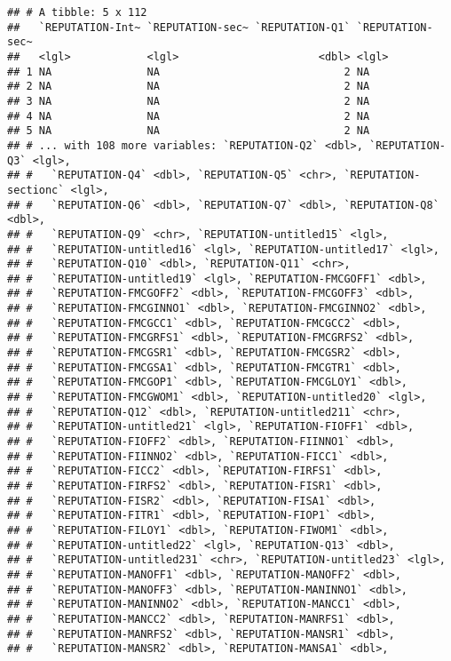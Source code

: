 \documentclass[
]{article}
\begin{document}
\begin{verbatim}
## # A tibble: 5 x 112
##   `REPUTATION-Int~ `REPUTATION-sec~ `REPUTATION-Q1` `REPUTATION-sec~
##   <lgl>            <lgl>                      <dbl> <lgl>           
## 1 NA               NA                             2 NA              
## 2 NA               NA                             2 NA              
## 3 NA               NA                             2 NA              
## 4 NA               NA                             2 NA              
## 5 NA               NA                             2 NA              
## # ... with 108 more variables: `REPUTATION-Q2` <dbl>, `REPUTATION-Q3` <lgl>,
## #   `REPUTATION-Q4` <dbl>, `REPUTATION-Q5` <chr>, `REPUTATION-sectionc` <lgl>,
## #   `REPUTATION-Q6` <dbl>, `REPUTATION-Q7` <dbl>, `REPUTATION-Q8` <dbl>,
## #   `REPUTATION-Q9` <chr>, `REPUTATION-untitled15` <lgl>,
## #   `REPUTATION-untitled16` <lgl>, `REPUTATION-untitled17` <lgl>,
## #   `REPUTATION-Q10` <dbl>, `REPUTATION-Q11` <chr>,
## #   `REPUTATION-untitled19` <lgl>, `REPUTATION-FMCGOFF1` <dbl>,
## #   `REPUTATION-FMCGOFF2` <dbl>, `REPUTATION-FMCGOFF3` <dbl>,
## #   `REPUTATION-FMCGINNO1` <dbl>, `REPUTATION-FMCGINNO2` <dbl>,
## #   `REPUTATION-FMCGCC1` <dbl>, `REPUTATION-FMCGCC2` <dbl>,
## #   `REPUTATION-FMCGRFS1` <dbl>, `REPUTATION-FMCGRFS2` <dbl>,
## #   `REPUTATION-FMCGSR1` <dbl>, `REPUTATION-FMCGSR2` <dbl>,
## #   `REPUTATION-FMCGSA1` <dbl>, `REPUTATION-FMCGTR1` <dbl>,
## #   `REPUTATION-FMCGOP1` <dbl>, `REPUTATION-FMCGLOY1` <dbl>,
## #   `REPUTATION-FMCGWOM1` <dbl>, `REPUTATION-untitled20` <lgl>,
## #   `REPUTATION-Q12` <dbl>, `REPUTATION-untitled211` <chr>,
## #   `REPUTATION-untitled21` <lgl>, `REPUTATION-FIOFF1` <dbl>,
## #   `REPUTATION-FIOFF2` <dbl>, `REPUTATION-FIINNO1` <dbl>,
## #   `REPUTATION-FIINNO2` <dbl>, `REPUTATION-FICC1` <dbl>,
## #   `REPUTATION-FICC2` <dbl>, `REPUTATION-FIRFS1` <dbl>,
## #   `REPUTATION-FIRFS2` <dbl>, `REPUTATION-FISR1` <dbl>,
## #   `REPUTATION-FISR2` <dbl>, `REPUTATION-FISA1` <dbl>,
## #   `REPUTATION-FITR1` <dbl>, `REPUTATION-FIOP1` <dbl>,
## #   `REPUTATION-FILOY1` <dbl>, `REPUTATION-FIWOM1` <dbl>,
## #   `REPUTATION-untitled22` <lgl>, `REPUTATION-Q13` <dbl>,
## #   `REPUTATION-untitled231` <chr>, `REPUTATION-untitled23` <lgl>,
## #   `REPUTATION-MANOFF1` <dbl>, `REPUTATION-MANOFF2` <dbl>,
## #   `REPUTATION-MANOFF3` <dbl>, `REPUTATION-MANINNO1` <dbl>,
## #   `REPUTATION-MANINNO2` <dbl>, `REPUTATION-MANCC1` <dbl>,
## #   `REPUTATION-MANCC2` <dbl>, `REPUTATION-MANRFS1` <dbl>,
## #   `REPUTATION-MANRFS2` <dbl>, `REPUTATION-MANSR1` <dbl>,
## #   `REPUTATION-MANSR2` <dbl>, `REPUTATION-MANSA1` <dbl>,

\end{verbatim}
\end{document}
